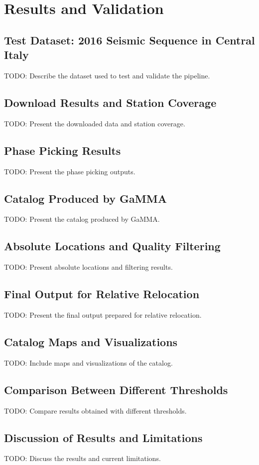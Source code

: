 \chapter{Results and Validation}

\section{Test Dataset: 2016 Seismic Sequence in Central Italy}
TODO: Describe the dataset used to test and validate the pipeline.

\section{Download Results and Station Coverage}
TODO: Present the downloaded data and station coverage.

\section{Phase Picking Results}
TODO: Present the phase picking outputs.

\section{Catalog Produced by GaMMA}
TODO: Present the catalog produced by GaMMA.

\section{Absolute Locations and Quality Filtering}
TODO: Present absolute locations and filtering results.

\section{Final Output for Relative Relocation}
TODO: Present the final output prepared for relative relocation.

\section{Catalog Maps and Visualizations}
TODO: Include maps and visualizations of the catalog.

\section{Comparison Between Different Thresholds}
TODO: Compare results obtained with different thresholds.

\section{Discussion of Results and Limitations}
TODO: Discuss the results and current limitations.

